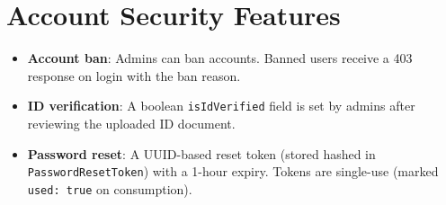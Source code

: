 \section{Account Security Features}

\begin{itemize}
  \item \textbf{Account ban}: Admins can ban accounts. Banned users receive a 403 response on login with the ban reason.
  \item \textbf{ID verification}: A boolean \texttt{isIdVerified} field is set by admins after reviewing the uploaded ID document.
  \item \textbf{Password reset}: A UUID-based reset token (stored hashed in \texttt{PasswordResetToken}) with a 1-hour expiry. Tokens are single-use (marked \texttt{used: true} on consumption).
\end{itemize}

